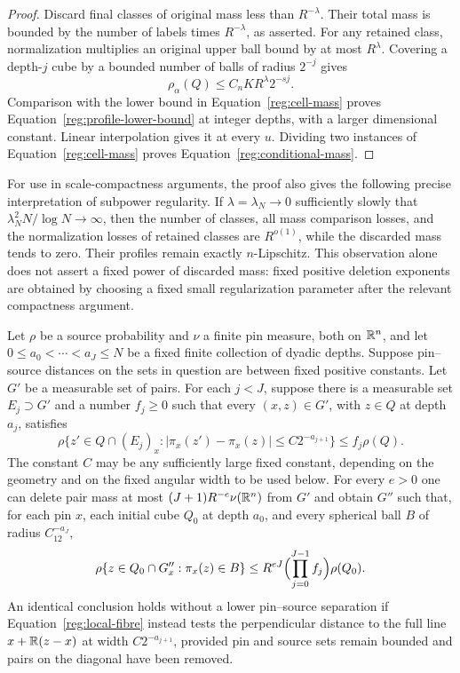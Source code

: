 \begin{proof}
Discard final classes of original mass less than $R^{-\lambda}$.
Their total mass is bounded by the number of labels times
$R^{-\lambda}$, as asserted.  For any retained class, normalization
multiplies an original upper ball bound by at most $R^\lambda$.
Covering a depth-$j$ cube by a bounded number of balls of radius
$2^{-j}$ gives
\[
\rho_\alpha(Q)\le C_nKR^\lambda2^{-sj}.
\]
Comparison with the lower bound in Equation~\eqref{reg:cell-mass}
proves Equation~\eqref{reg:profile-lower-bound} at integer depths,
with a larger dimensional constant.  Linear interpolation gives it at
every $u$.  Dividing two instances of Equation~\eqref{reg:cell-mass}
proves Equation~\eqref{reg:conditional-mass}.
\end{proof}

For use in scale-compactness arguments, the proof also gives the
following precise interpretation of subpower regularity.  If
$\lambda=\lambda_N\to0$ sufficiently slowly that
$\lambda_N^2N/\log N\to\infty$, then the number of classes, all mass
comparison losses, and the normalization losses of retained classes
are $R^{o(1)}$, while the discarded mass tends to zero.  Their
profiles remain exactly $n$-Lipschitz.  This
observation alone does not assert a fixed power of discarded mass:
fixed positive deletion exponents are obtained by choosing a fixed
small regularization parameter after the relevant compactness
argument.

\begin{lemma}\label{reg:pruning-multiplication}
Let $\rho$ be a source probability and $\nu$ a finite pin measure,
both on $\mathbb R^n$,
and let $0\le a_0<\cdots<a_J\le N$ be a fixed finite collection of
dyadic depths.  Suppose pin--source distances on the sets in question
are between fixed positive constants.  Let $G'$ be a measurable set of
pairs.  For each $j<J$, suppose there is a measurable set
$E_j\supset G'$ and a number $f_j\ge0$ such that every
$(x,z)\in G'$, with $z\in Q$ at depth $a_j$, satisfies
\begin{equation}\label{reg:local-fibre}
\rho\{z'\in Q\cap(E_j)_x:
     |\pi_x(z')-\pi_x(z)|\le C2^{-a_{j+1}}\}
 \le f_j\rho(Q).
\end{equation}
The constant $C$ may be any sufficiently large fixed constant,
depending on the geometry and on the fixed angular width to be used
below.  For every $e>0$ one can delete pair mass at most
$(J+1)R^{-e}\nu(\mathbb R^n)$ from $G'$ and obtain $G''$ such that, for each
pin $x$, each initial cube $Q_0$ at depth $a_0$, and every spherical
ball $B$ of radius $C_12^{-a_J}$,
\begin{equation}\label{reg:multiplied-fibre}
\rho\{z\in Q_0\cap G''_x:\pi_x(z)\in B\}
 \le R^{eJ}\Bigl(\prod_{j=0}^{J-1}f_j\Bigr)\rho(Q_0).
\end{equation}
An identical conclusion holds without a lower pin--source separation
if Equation~\eqref{reg:local-fibre} instead tests the perpendicular
distance to the full line $x+\mathbb R(z-x)$ at width $C2^{-a_{j+1}}$,
provided pin and source sets remain bounded and pairs on the diagonal
have been removed.
\end{lemma}

